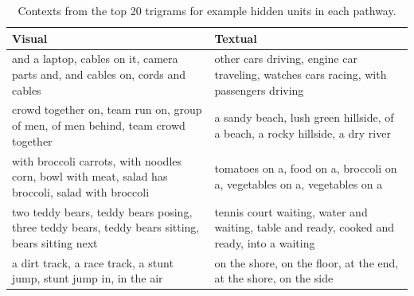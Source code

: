 \begin{table}[t]
\small
\caption{Contexts from the top 20 trigrams for example hidden units in each pathway.}
\label{tab:contexts}
\vspace{.2cm}
\centering
    \begin{tabular}{ | p{6cm} | p{6cm}|}
    \hline
    {\sc Visual} & {\sc Textual} %
    \\
    \hline
    and a laptop, cables on it, camera parts and, and cables on, cords and cables & 
    other cars driving, engine car traveling, watches cars racing, with passengers driving 
     \\
    \hline

    crowd together on, team run on, group of men, of men behind, team crowd together &
    a sandy beach, lush green hillside, of a beach, a rocky hillside, a dry river 
    \\
    \hline
    
    with broccoli carrots, with noodles corn, bowl with meat, salad has broccoli, salad with broccoli &

    tomatoes on a, food on a,  broccoli on a, vegetables on a, vegetables on a 
    \\
    \hline       
    
    
    two teddy bears, teddy bears posing, three teddy bears, teddy bears sitting, bears 
sitting next
    & tennis court waiting, water and waiting, table and ready, cooked and ready, into a waiting
    \\
    \hline
    a dirt track, a race track, a stunt jump, stunt jump in, in the air 
    & on the shore, on the floor, at the end, at the shore, on the side
    \\
    \hline
        
    \end{tabular}
\end{table}


